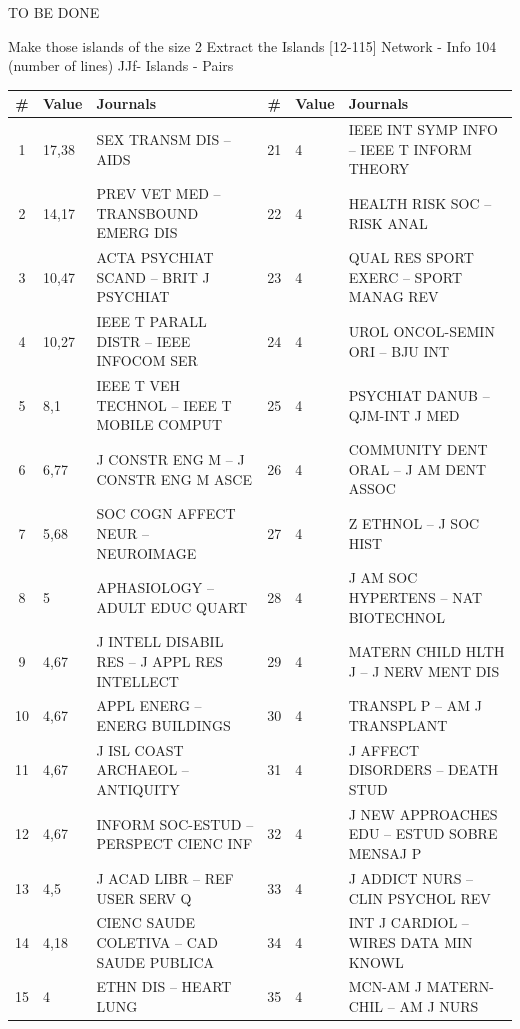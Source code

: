 \documentclass[11pt]{article} %
\begin{document}
TO BE DONE 

Make those islands of the size 2
Extract the Islands [12-115] Network - Info 104 (number of lines) 
JJf- Islands - Pairs

\begin{table}

\renewcommand{\arraystretch}{0.82}
\small
\begin{tabular}{c|l|p{6cm}||c|l|p{6cm}|}
\# &	Value&	Journals &	\# &	Value&	Journals \\  \hline 
1&	17,38&	SEX TRANSM DIS --  AIDS       &	21&	4&	IEEE INT SYMP INFO --  IEEE T INFORM THEORY   \\
2&	14,17&	PREV VET MED --  TRANSBOUND EMERG DIS     &	22&	4&	HEALTH RISK SOC --  RISK ANAL      \\
3&	10,47&	ACTA PSYCHIAT SCAND --  BRIT J PSYCHIAT     &	23&	4&	QUAL RES SPORT EXERC --  SPORT MANAG REV    \\
4&	10,27&	IEEE T PARALL DISTR --  IEEE INFOCOM SER    &	24&	4&	UROL ONCOL-SEMIN ORI --  BJU INT      \\
5&	8,1&	IEEE T VEH TECHNOL --  IEEE T MOBILE COMPUT   &	25&	4&	PSYCHIAT DANUB --  QJM-INT J MED      \\
6&	6,77&	J CONSTR ENG M --  J CONSTR ENG M ASCE  &	26&	4&	COMMUNITY DENT ORAL --  J AM DENT ASSOC    \\
7&	5,68&	SOC COGN AFFECT NEUR --  NEUROIMAGE      &	27&	4&	Z ETHNOL --  J SOC HIST      \\
8&	5&	APHASIOLOGY --  ADULT EDUC QUART       &	28&	4&	J AM SOC HYPERTENS --  NAT BIOTECHNOL     \\
9&	4,67&	J INTELL DISABIL RES --  J APPL RES INTELLECT   &	29&	4&	MATERN CHILD HLTH J --  J NERV MENT DIS   \\
10&	4,67&	APPL ENERG --  ENERG BUILDINGS       &	30&	4&	TRANSPL P --  AM J TRANSPLANT      \\
11&	4,67&	J ISL COAST ARCHAEOL --  ANTIQUITY      &	31&	4&	J AFFECT DISORDERS --  DEATH STUD      \\
12&	4,67&	INFORM SOC-ESTUD --  PERSPECT CIENC INF      &	32&	4&	J NEW APPROACHES EDU --  ESTUD SOBRE MENSAJ P   \\
13&	4,5&	J ACAD LIBR --  REF USER SERV Q    &	33&	4&	J ADDICT NURS --  CLIN PSYCHOL REV     \\
14&	4,18&	CIENC SAUDE COLETIVA --  CAD SAUDE PUBLICA     &	34&	4&	INT J CARDIOL --  WIRES DATA MIN KNOWL    \\
15&	4&	ETHN DIS --  HEART LUNG       &	35&	4&	MCN-AM J MATERN-CHIL --  AM J NURS     \\

\end{tabular}
\end{table}
\end{document}
